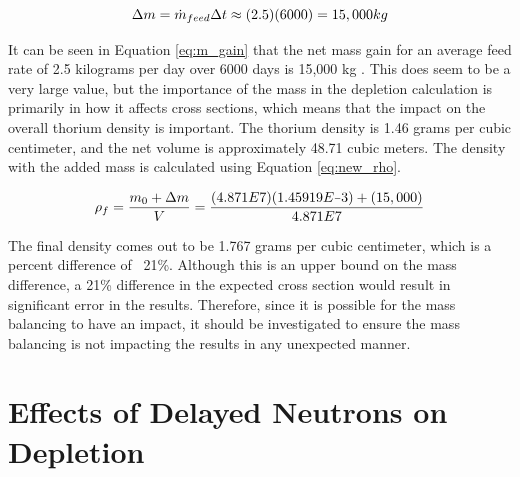\begin{equation} \hfill
\Delta m = \Dot{m}_{feed} \Delta t \approx (2.5)(6000) = 15,000 kg
\hfill\label{eq:m_gain} \end{equation}

It can be seen in Equation \eqref{eq:m_gain} that the net mass gain for an average feed rate of 2.5 kilograms per day over 6000 days is 15,000 kg \cite{rykhlevskii_fuel_2020, betzler_molten_2017}. This does seem to be a very large value, but the importance of the mass in the depletion calculation is primarily in how it affects cross sections, which means that the impact on the overall thorium density is important. The thorium density is 1.46 grams per cubic centimeter, and the net volume is approximately 48.71 cubic meters. The density with the added mass is calculated using Equation \eqref{eq:new_rho}.

\begin{equation} \hfill
\rho_f = \frac{m_0 + \Delta m}{V} = \frac{(4.871E7)(1.45919E\minus3) + (15,000)}{4.871E7}
\hfill\label{eq:new_rho} \end{equation}

The final density comes out to be 1.767 grams per cubic centimeter, which is a percent difference of ~21\%. Although this is an upper bound on the mass difference, a 21\% difference in the expected cross section would result in significant error in the results. Therefore, since it is possible for the mass balancing to have an impact, it should be investigated to ensure the mass balancing is not impacting the results in any unexpected manner.









\section{Effects of Delayed Neutrons on Depletion}

